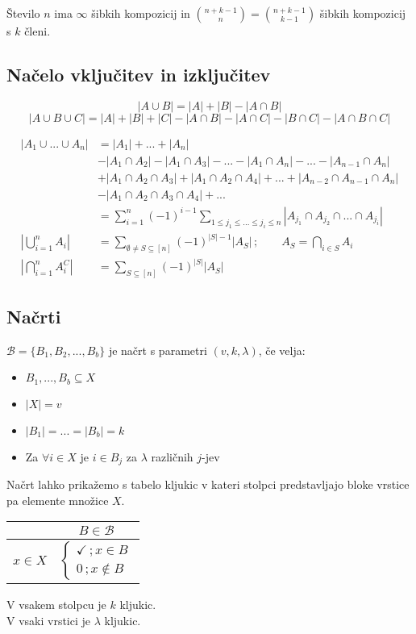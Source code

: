 \documentclass[11pt,a4paper]{article}
\begin{document}
Število $n$ ima $\infty$ šibkih kompozicij in $\binom{n+k-1}{n} = \binom{n+k-1}{k-1}$ šibkih kompozicij s $k$ členi. 

\subsection*{Načelo vključitev in izključitev}
\[|A \cup B| = |A| + |B| - |A \cap B| \]
\[|A \cup B \cup C| = |A| + |B| + |C| - |A \cap B| - |A \cap C| - |B \cap C| - |A \cap B \cap C| \]

\begin{align*}
    |A_1 \cup ... \cup A_n| & = |A_1| + ... + |A_n| \\
        & - |A_1 \cap A_2| - |A_1 \cap A_3| - ... - |A_1 \cap A_n| - ... - |A_{n-1} \cap A_n| \\
        & + |A_1 \cap A_2 \cap A_3| + |A_1 \cap A_2 \cap A_4| + ... + |A_{n-2} \cap A_{n-1} \cap A_n| \\
        & - |A_1 \cap A_2 \cap A_3 \cap A_4| + ... \\
        & = \sum_{i=1}^n (-1)^{i-1} \sum_{1 \leq j_1 \le ... \le j_i \leq n} |A_{j_1} \cap A_{j_2} \cap ... \cap A_{j_i} | \\
    \left|\bigcup_{i=1}^n A_i\right| & = \sum_{\emptyset \neq S \subseteq [n]} (-1)^{|S| - 1} \left|A_S \right| \, ; \qquad A_S = \bigcap_{i\in S } A_i \\
    \left|\bigcap_{i=1}^n A_i^C\right| & = \sum_{S \subseteq [n]} (-1)^{|S|} \left| A_S \right|
\end{align*}

\subsection*{Načrti}
$\mathcal{B}=\{B_1,B_2,...,B_b\}$ je načrt s parametri $(v,k,\lambda)$, če velja:
\begin{itemize}
    \item $B_1,..., B_b \subseteq X$
    \item $|X| = v$
    \item $|B_1| = ... = |B_b| = k$
    \item Za $\forall i \in X$ je $i\in B_j$ za $\lambda$ različnih $j$-jev
\end{itemize}
Načrt lahko prikažemo s tabelo kljukic v kateri stolpci predstavljajo bloke vrstice pa elemente množice $X$.
\begin{center}
    \begin{tabular}{  c | c } 
         & $B \in \mathcal{B}$ \\ 
        \hline
        $x \in X$ & $\begin{cases}
            \checkmark\,; x\in B\\
            0\,; x \notin B
        \end{cases}$\\
    \end{tabular}
\end{center}
V vsakem stolpcu je $k$ kljukic.\\
V vsaki vrstici je $\lambda$ kljukic.
\end{document}
